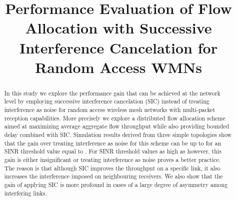 \documentclass[conference]{IEEEtran}
\begin{document}
\title{Performance Evaluation of Flow Allocation with Successive Interference Cancelation for Random Access WMNs}


\author{
\and
{}
\and
{}
}

\maketitle


\begin{abstract}
In this study we explore the performance gain that can be achieved at the network level
by employing successive interference cancelation (SIC) instead of treating interference as noise for
random access wireless mesh networks with multi-packet reception capabilities.
More precisely we explore a distributed flow allocation scheme aimed at maximizing average aggregate flow throughput
while also providing bounded delay combined with SIC.
Simulation results derived from three simple topologies show that the gain over treating interference as noise
for this scheme can be up to  for an SINR threshold value equal to .
For SINR threshold values as high as  however, this gain is either insignificant or treating
interference as noise proves a better practice. 
The reason is that although SIC improves the throughput on a specific link, it also increases the interference imposed on neighbouring receivers.
We also show that the gain of applying SIC is more profound in cases of a large degree of asymmetry among interfering links.
\end{abstract}

\normalsize

\IEEEpeerreviewmaketitle
\end{document}
